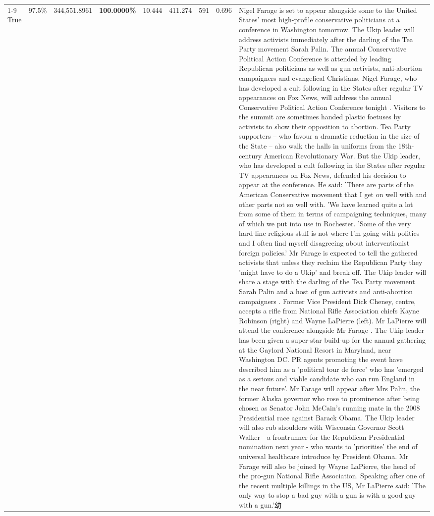 \begin{table}[H]
\begin{tabular}{lllrlllll}
\cline{1-9}
True & 97.5\% & 344,551.8961 & \bfseries \color{red} 100.0000\% & 10.444 & 411.274 & 591 & 0.696 & Nigel Farage is set to appear alongside some to the United States' most high-profile conservative politicians at a conference in Washington tomorrow. The Ukip leader will address activists immediately after the darling of the Tea Party movement Sarah Palin. The annual Conservative Political Action Conference is attended by leading Republican politicians as well as gun activists, anti-abortion campaigners and evangelical Christians. Nigel Farage, who has developed a cult following in the States after regular TV appearances on Fox News, will address the annual Conservative Political Action Conference tonight . Visitors to the summit are sometimes handed plastic foetuses by activists to show their opposition to abortion. Tea Party supporters – who favour a dramatic reduction in the size of the State – also walk the halls in uniforms from the 18th-century American Revolutionary War. But the Ukip leader, who has developed a cult following in the States after regular TV appearances on Fox News, defended his decision to appear at the conference. He said: 'There are parts of the American Conservative movement that I get on well with and other parts not so well with. 'We have learned quite a lot from some of them in terms of campaigning techniques, many of which we put into use in Rochester. 'Some of the very hard-line religious stuff is not where I'm going with politics and I often find myself disagreeing about interventionist foreign policies.' Mr Farage is expected to tell the gathered activists that unless they reclaim the Republican Party they 'might have to do a Ukip' and break off. The Ukip leader will share a stage with the darling of the Tea Party movement Sarah Palin and a host of gun activists and anti-abortion campaigners . Former Vice President Dick Cheney, centre, accepts a rifle from National Rifle Association chiefs Kayne Robinson (right) and Wayne LaPierre (left). Mr LaPierre will attend the conference alongside Mr Farage . The Ukip leader has been given a super-star build-up for the annual gathering at the Gaylord National Resort in Maryland, near Washington DC. PR agents promoting the event have described him as a 'political tour de force' who has 'emerged as a serious and viable candidate who can run England in the near future'. Mr Farage will appear after Mrs Palin, the former Alaska governor who rose to prominence after being chosen as Senator John McCain's running mate in the 2008 Presidential race against Barack Obama. The Ukip leader will also rub shoulders with Wisconsin Governor Scott Walker - a frontrunner for the Republican Presidential nomination next year - who wants to 'prioritise' the end of universal healthcare introduce by President Obama. Mr Farage will also be joined by Wayne LaPierre, the head of the pro-gun National Rifle Association. Speaking after one of the recent multiple killings in the US, Mr LaPierre said: 'The only way to stop a bad guy with a gun is with a good guy with a gun.'幼 \\

\end{tabular}
\end{table}
